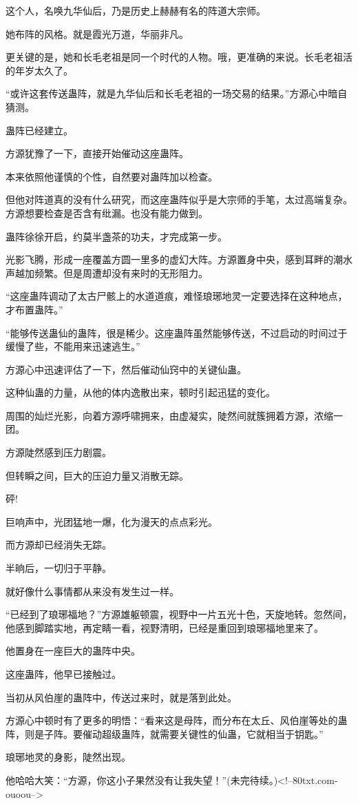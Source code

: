 \begin{this_body}
这个人，名唤九华仙后，乃是历史上赫赫有名的阵道大宗师。

她布阵的风格。就是霞光万道，华丽非凡。

更关键的是，她和长毛老祖是同一个时代的人物。哦，更准确的来说。长毛老祖活的年岁太久了。

“或许这套传送蛊阵，就是九华仙后和长毛老祖的一场交易的结果。”方源心中暗自猜测。

蛊阵已经建立。

方源犹豫了一下，直接开始催动这座蛊阵。

本来依照他谨慎的个性，自然要对蛊阵加以检查。

但他对阵道真的没有什么研究，而这座蛊阵似乎是大宗师的手笔，太过高端复杂。方源想要检查是否含有纰漏。也没有能力做到。

蛊阵徐徐开启，约莫半盏茶的功夫，才完成第一步。

光影飞腾，形成一座覆盖方圆一里多的虚幻大阵。方源置身中央，感到耳畔的潮水声越加频繁。但是周遭却没有来时的无形阻力。

“这座蛊阵调动了太古尸骸上的水道道痕，难怪琅琊地灵一定要选择在这种地点，才布置蛊阵。”

“能够传送蛊仙的蛊阵，很是稀少。这座蛊阵虽然能够传送，不过启动的时间过于缓慢了些，不能用来迅速逃生。”

方源心中迅速评估了一下，然后催动仙窍中的关键仙蛊。

这种仙蛊的力量，从他的体内逸散出来，顿时引起迅猛的变化。

周围的灿烂光影，向着方源呼啸拥来，由虚凝实，陡然间就簇拥着方源，浓缩一团。

方源陡然感到压力剧震。

但转瞬之间，巨大的压迫力量又消散无踪。

砰!

巨响声中，光团猛地一爆，化为漫天的点点彩光。

而方源却已经消失无踪。

半晌后，一切归于平静。

就好像什么事情都从来没有发生过一样。

“已经到了琅琊福地？”方源雄躯顿震，视野中一片五光十色，天旋地转。忽然间，他感到脚踏实地，再定睛一看，视野清明，已经是重回到琅琊福地里来了。

他置身在一座巨大的蛊阵中央。

这座蛊阵，他早已接触过。

当初从风伯崖的蛊阵中，传送过来时，就是落到此处。

方源心中顿时有了更多的明悟：“看来这是母阵，而分布在太丘、风伯崖等处的蛊阵，则是子阵。要催动超级蛊阵，就需要关键性的仙蛊，它就相当于钥匙。”

琅琊地灵的身影，陡然出现。

他哈哈大笑：“方源，你这小子果然没有让我失望！”(未完待续。)<!--80txt.com-ouoou-->

\end{this_body}

